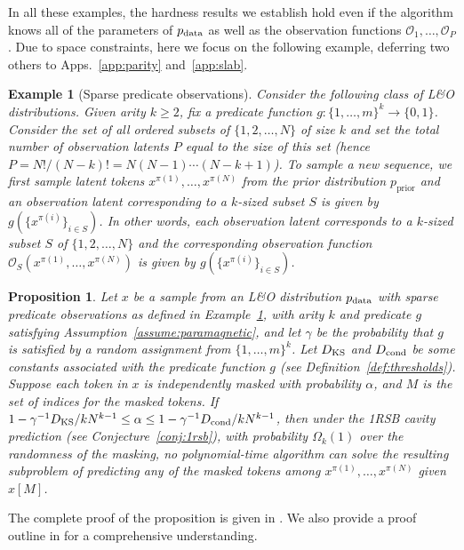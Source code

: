 \documentclass{article}
\newcommand{\prior}{p_{\textrm{prior}}}
\theoremstyle{plain}
\newtheorem{proposition}[theorem]{Proposition}
\newtheorem{example}[theorem]{Example}
\theoremstyle{definition}
\theoremstyle{remark}
\newcounter{theo}
\begin{document}
In all these examples, the hardness results we establish hold even if the algorithm knows all of the parameters of $p_{\rm data}$ as well as the observation functions $\mathcal{O}_1,\ldots,\mathcal{O}_P$. Due to space constraints, here we focus on the following example, deferring two others to Apps.~\ref{app:parity} and~\ref{app:slab}.

\begin{example}[Sparse predicate observations]\label{example:csp}
    Consider the following class of L\&O distributions. Given \emph{arity} $k\ge 2$, fix a \emph{predicate} function $g: \{1,\ldots,m\}^k \to \{0,1\}$. Consider 
    the set of all ordered subsets of $\{1,2,\ldots,N\}$ of size $k$ and set the total number of observation latents $P$ equal to the size of this set (hence $P = N ! / (N-k)! = N(N-1)\cdots(N-k+1)$). To sample a new sequence, we first sample latent tokens $x^{\pi(1)},\ldots,x^{\pi(N)}$ from the prior distribution $\prior$ and an observation latent corresponding to a $k$-sized subset $S$ is given by $g( \{ x^{\pi(i)} \}_{i \in S} )$. In other words, each observation latent corresponds to a $k$-sized subset $S$ of $\{1,2,\ldots,N\}$ and the corresponding observation function $\mathcal{O}_S(x^{\pi(1)}, \ldots, x^{\pi(N)} )$ is given by $g( \{ x^{\pi(i)} \}_{i \in S} )$.
\end{example}


\begin{proposition}\label{prop:csp}
    Let $x$ be a sample from an L\&O distribution $p_{\rm data}$ with sparse predicate observations as defined in Example~\ref{example:csp}, with arity $k$ and predicate $g$ satisfying Assumption~\ref{assume:paramagnetic}, and let $\gamma$ be the probability that $g$ is satisfied by a random assignment from $\{1,\ldots,m\}^k$. Let $D_{\rm KS}$ and $D_{\rm cond}$ be some constants associated with the predicate function $g$ (see Definition~\ref{def:thresholds}). Suppose each token in $x$ is independently masked with probability $\alpha$, and $M$ is the set of indices for the masked tokens. If $1 - \gamma^{-1} D_{\rm KS}/kN^{k-1} \le \alpha \le 1 - \gamma^{-1} D_{\rm cond}/kN^{k-1}$, then under the \emph{1RSB cavity prediction} (see Conjecture~\ref{conj:1rsb}), with probability $\Omega_k(1)$ over the randomness of the masking, no polynomial-time algorithm can solve the resulting subproblem of predicting any of the masked tokens among $x^{\pi(1)},\ldots,x^{\pi(N)}$ given $x[M]$.
\end{proposition}
The complete proof of the proposition is given in . We also provide a proof outline in  for a comprehensive understanding. 
\end{document}
